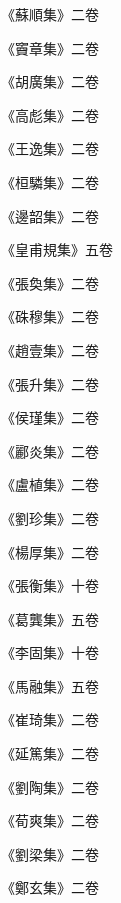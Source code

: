 \begin{pinyinscope}
 《蘇順集》二卷



 《竇章集》二卷



 《胡廣集》二卷



 《高彪集》二卷



 《王逸集》二卷



 《桓驎集》二卷



 《邊韶集》二卷



 《皇甫規集》五卷



 《張奐集》二卷



 《硃穆集》二卷



 《趙壹集》二卷



 《張升集》二卷



 《侯瑾集》二卷



 《酈炎集》二卷



 《盧植集》二卷



 《劉珍集》二卷



 《楊厚集》二卷



 《張衡集》十卷



 《葛龔集》五卷



 《李固集》十卷



 《馬融集》五卷



 《崔琦集》二卷



 《延篤集》二卷



 《劉陶集》二卷



 《荀爽集》二卷



 《劉梁集》二卷



 《鄭玄集》二卷




\end{pinyinscope}
